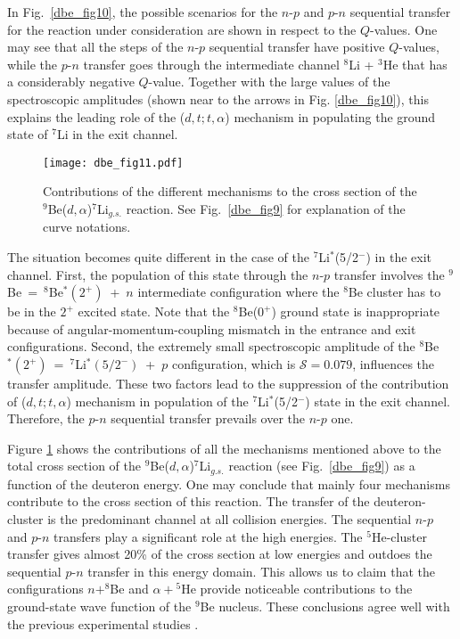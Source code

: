 \documentclass[
12pt, %
oneside, %
english, %
onehalfspacing, %
onehalfspacing, %
headsepline, %
]{MastersDoctoralThesis} %
\begin{document}
In Fig.~\ref{dbe_fig10}, the possible scenarios for the $n$-$p$ and $p$-$n$ sequential transfer for the reaction under consideration are shown in respect to the $Q$-values. One may see that all the steps of the $n$-$p$ sequential transfer have positive $Q$-values, while the $p$-$n$ transfer goes through the intermediate channel ${}^8$Li + ${}^3$He that has a considerably negative $Q$-value. Together with the large values of the spectroscopic amplitudes (shown near to the arrows in Fig. \ref{dbe_fig10}), this explains the leading role of the ($d,t;t,\alpha$) mechanism in populating the ground state of ${}^7$Li in the exit channel.

\begin{figure}[tp]
\centering
\texttt{[image: dbe\_fig11.pdf]}
\decoRule
\caption{\label{dbe_fig11} \footnotesize Contributions of the different mechanisms to the cross section of the ${}^9$Be($d,\alpha$)${}^7$Li$_{g.s.}$ reaction. See Fig.~\ref{dbe_fig9} for explanation of the curve notations.}
\end{figure}	

The situation becomes quite different in the case of the ${}^7$Li$^*$(5/2$^-$) in the exit channel. First, the population of this state through the $n$-$p$ transfer involves the ${}^9$Be~=~${}^8$Be$^*(2^+)$~+~$n$ intermediate configuration where the ${}^8$Be cluster has to be in the $2^+$ excited state. Note that the ${}^8$Be($0^+$) ground state is inappropriate because of angular-momentum-coupling mismatch in the entrance and exit configurations. Second, the extremely small spectroscopic amplitude of the ${}^8$Be$^*(2^+)$~=~${}^7$Li$^*(5/2^-)$~+~$p$ configuration, which is $\mathcal{S} = 0.079$, influences the transfer amplitude. These two factors lead to the suppression of the contribution of ($d,t;t,\alpha$) mechanism in population of the ${}^7$Li$^*$(5/2$^-$) state in the exit channel. Therefore, the $p$-$n$ sequential transfer prevails over the $n$-$p$ one. 

Figure \ref{dbe_fig11} shows the contributions of all the mechanisms mentioned above to the total cross section of the ${}^9$Be($d,\alpha$)${}^7$Li$_{g.s.}$ reaction (see Fig.~\ref{dbe_fig9}) as a function of the deuteron energy. One may conclude that mainly four mechanisms contribute to the cross section of this reaction. The transfer of the deuteron-cluster is the predominant channel at all collision energies. The sequential $n$-$p$ and $p$-$n$ transfers play a significant role at the high energies. The ${}^5$He-cluster transfer gives almost 20\% of the cross section at low energies and outdoes the sequential $p$-$n$ transfer in this energy domain. This allows us to claim that the configurations $n+^8$Be and $\alpha+{}^5$He provide noticeable contributions to the ground-state wave function of the ${}^9$Be nucleus. These conclusions agree well with the previous experimental studies \cite{brown2007, papka2007}.
\end{document}
